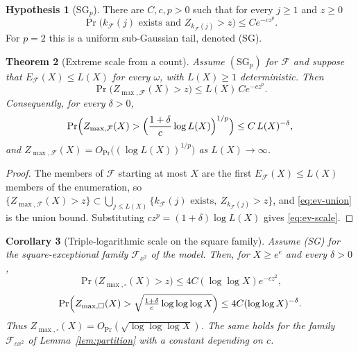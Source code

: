 \documentclass[11pt]{amsart}
\numberwithin{equation}{section}
\theoremstyle{plain}
\newtheorem{theorem}{Theorem}[section]
\newtheorem{corollary}[theorem]{Corollary}
\theoremstyle{definition}
\newtheorem{hypothesis}[theorem]{Hypothesis}
\theoremstyle{remark}
\newcommand{\F}{\mathcal{F}}
\begin{document}
\begin{hypothesis}[$\mathrm{SG}_p$]
\label{hyp:SG}
There are $C,c,p>0$ such that for every $j\ge1$ and $z\ge0$
\[
\Pr\bigl(k_\F(j)\text{ exists and }Z_{k_\F(j)}>z\bigr)\le Ce^{-cz^p}.
\]
For $p=2$ this is a uniform sub-Gaussian tail, denoted (SG).
\end{hypothesis}

\begin{theorem}[Extreme scale from a count]
\label{thm:ev-union}
Assume $(\mathrm{SG}_p)$ for $\F$ and suppose that $E_\F(X)\le L(X)$ for
every $\omega$, with $L(X)\ge1$ deterministic. Then
\begin{equation}
\label{eq:ev-union}
\Pr\bigl(Z_{\max,\F}(X)>z\bigr)\le L(X)\,Ce^{-cz^p}.
\end{equation}
Consequently, for every $\delta>0$,
\begin{equation}
\label{eq:ev-scale}
\Pr\Bigl(Z_{\max,\F}(X)>\Bigl(\frac{1+\delta}{c}\log L(X)\Bigr)^{1/p}\Bigr)
\le C\,L(X)^{-\delta},
\end{equation}
and $Z_{\max,\F}(X)=O_{\Pr}\bigl((\log L(X))^{1/p}\bigr)$ as $L(X)\to\infty$.
\end{theorem}

\begin{proof}
The members of $\F$ starting at most $X$ are the first $E_\F(X)\le L(X)$
members of the enumeration, so
$\{Z_{\max,\F}(X)>z\}\subset\bigcup_{j\le L(X)}\{k_\F(j)\text{ exists},\
Z_{k_\F(j)}>z\}$, and \eqref{eq:ev-union} is the union bound. Substituting
$cz^p=(1+\delta)\log L(X)$ gives \eqref{eq:ev-scale}.
\end{proof}

\begin{corollary}[Triple-logarithmic scale on the square family]
\label{cor:ev-square}
Assume (SG) for the square-exceptional family $\F_{x^2}$ of the model. Then,
for $X\ge e^e$ and every $\delta>0$,
\begin{equation}
\label{eq:ev-square}
\Pr\bigl(Z_{\max,\square}(X)>z\bigr)\le4C(\log\log X)e^{-cz^2},
\end{equation}
\begin{equation}
\label{eq:ev-square-b}
\Pr\Bigl(Z_{\max,\square}(X)>\sqrt{\tfrac{1+\delta}{c}\log\log\log X}\Bigr)
\le4C(\log\log X)^{-\delta}.
\end{equation}
Thus $Z_{\max,\square}(X)=O_{\Pr}(\sqrt{\log\log\log X})$. The same holds for
the family $\F_{cx^2}$ of Lemma~\ref{lem:partition} with a constant depending
on $c$.
\end{corollary}
\end{document}
